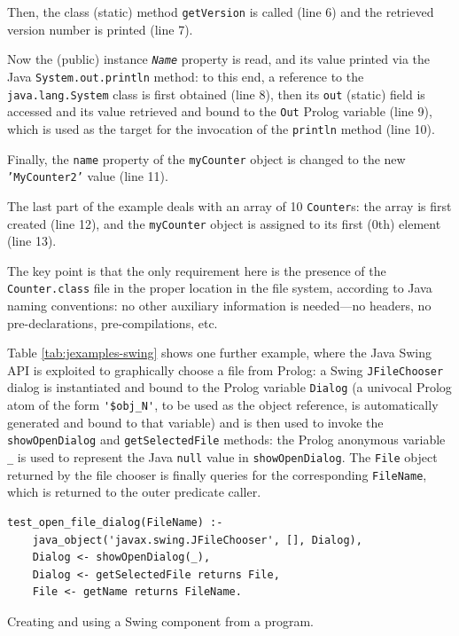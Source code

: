 Then, the class (static) method \texttt{getVersion} is called (line 6) and the retrieved version number is printed (line 7).

Now the (public) instance \textit{\texttt{Name}} property is read, and its value printed via the Java \texttt{System.out.println} method: to this end, a reference to the \texttt{java.lang.System} class is first obtained (line 8), then its \texttt{out} (static) field is accessed and its value retrieved and bound to the \texttt{Out} Prolog variable (line 9), which is used as the target for the invocation of the \texttt{println} method (line 10).

Finally, the \texttt{name} property of the \texttt{myCounter} object is changed to the new \texttt{'MyCounter2'} value (line 11).

The last part of the example deals with an array of 10 \texttt{Counter}s: the array is first created (line 12), and the \texttt{myCounter} object is assigned to its first (0th) element (line 13).

The key point is that the only requirement here is the presence of the \texttt{Counter.class} file in the proper location in the file system, according to Java naming conventions: no other auxiliary information is needed---no headers, no pre-declarations, pre-compilations, etc.


Table \ref{tab:jexamples-swing} shows one further example, where the Java Swing API is
exploited to graphically choose a file from Prolog: a Swing \texttt{JFileChooser} dialog is instantiated and bound to the Prolog variable \texttt{Dialog} (a univocal Prolog atom of the form \verb|'$obj_N'|, to be used as the object reference, is automatically generated and bound to that variable) and is then used to invoke the \texttt{showOpenDialog} and
\texttt{getSelectedFile} methods: the Prolog anonymous variable \texttt{\_} is used to represent the Java \texttt{null} value in \texttt{showOpenDialog}.
%
The \texttt{File} object returned by the file chooser is finally queries for the corresponding \texttt{FileName}, which is returned to the outer predicate caller.


\begin{table}
\begin{verbatim}
test_open_file_dialog(FileName) :-
    java_object('javax.swing.JFileChooser', [], Dialog),
    Dialog <- showOpenDialog(_),
    Dialog <- getSelectedFile returns File,
    File <- getName returns FileName.
\end{verbatim}
\caption{Creating and using a Swing component from a \tuprolog{} program.}
\label{tab:jexamples-swing}
\end{table}

